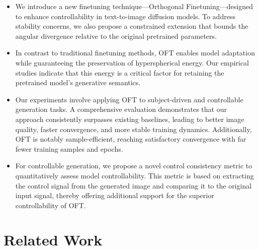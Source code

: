 \begin{itemize}[leftmargin=*,nosep]

    \item We introduce a new finetuning technique—Orthogonal Finetuning—designed to enhance controllability in text-to-image diffusion models. To address stability concerns, we also propose a constrained extension that bounds the angular divergence relative to the original pretrained parameters.
    \item In contrast to traditional finetuning methods, OFT enables model adaptation while guaranteeing the preservation of hyperspherical energy. Our empirical studies indicate that this energy is a critical factor for retaining the pretrained model's generative semantics.
    \item Our experiments involve applying OFT to subject-driven and controllable generation tasks. A comprehensive evaluation demonstrates that our approach consistently surpasses existing baselines, leading to better image quality, faster convergence, and more stable training dynamics. Additionally, OFT is notably sample-efficient, reaching satisfactory convergence with far fewer training samples and epochs.
    \item For controllable generation, we propose a novel control consistency metric to quantitatively assess model controllability. This metric is based on extracting the control signal from the generated image and comparing it to the original input signal, thereby offering additional support for the superior controllability of OFT.
\end{itemize}

\section{Related Work}


